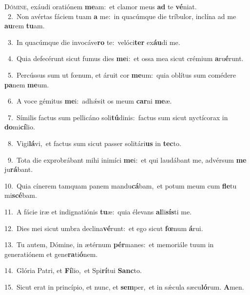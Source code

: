 \lettrine{\initial\textcolor{\initialcolor}{D}}{ómine,} exáudi oratiónem \textbf{me}\-am:~\star et clamor meus \textbf{ad} te \textbf{vé}\-niat.\\
{\numbfont\textcolor{\numbcolor}{~2.}}~Non avértas fáciem tuam \textbf{a} me:~\star in quacúmque die tríbulor, inclína ad me \textbf{au}\-rem \textbf{tu}\-am.\par
{\numbfont\textcolor{\numbcolor}{~3.}}~In quacúmque die invocáve\textbf{ro} te:~\star velóci\textbf{ter} ex\-\textbf{áu}\-di me.\par
{\numbfont\textcolor{\numbcolor}{~4.}}~Quia defecérunt sicut fumus dies \textbf{me}\-i:~\star et ossa mea sicut crémium \textbf{a}\-ru\-\textbf{é}\-runt.\par
{\numbfont\textcolor{\numbcolor}{~5.}}~Percússus sum ut fœnum, et áruit cor \textbf{me}\-um:~\star quia oblítus sum comédere \textbf{pa}\-nem \textbf{me}\-um.\par
{\numbfont\textcolor{\numbcolor}{~6.}}~A voce gémitus \textbf{me}\-i:~\star adhǽsit os meum \textbf{car}\-ni \textbf{me}\-æ.\par
{\numbfont\textcolor{\numbcolor}{~7.}}~Símilis factus sum pellicáno soli\-\textbf{tú}\-dinis:~\star factus sum sicut nyctícorax in \textbf{do}\-mi\-\textbf{cí}\-lio.\par
{\numbfont\textcolor{\numbcolor}{~8.}}~Vigi\-\textbf{lá}\-vi,~\star et factus sum sicut passer solitári\textbf{us} in \textbf{tec}\-to.\par
{\numbfont\textcolor{\numbcolor}{~9.}}~Tota die exprobrábant mihi inimíci \textbf{me}\-i:~\star et qui laudábant me, advérsum \textbf{me} ju\-\textbf{rá}\-bant.\par
{\numbfont\textcolor{\numbcolor}{10.}}~Quia cínerem tamquam panem mandu\-\textbf{cá}\-bam,~\star et potum meum cum \textbf{fle}\-tu mi\-\textbf{scé}\-bam.\par
{\numbfont\textcolor{\numbcolor}{11.}}~A fácie iræ et indignatiónis \textbf{tu}\-æ:~\star quia élevans \textbf{al}\-li\-\textbf{sís}\-ti me.\par
{\numbfont\textcolor{\numbcolor}{12.}}~Dies mei sicut umbra declina\-\textbf{vé}\-runt:~\star et ego sicut \textbf{fœ}\-num \textbf{á}\-rui.\par
{\numbfont\textcolor{\numbcolor}{13.}}~Tu autem, Dómine, in ætérnum \textbf{pér}\-manes:~\star et memoriále tuum in generatiónem et gene\-\textbf{ra}\-ti\-\textbf{ó}\-nem.\par
{\numbfont\textcolor{\numbcolor}{14.}}~Glória Patri, et \textbf{Fí}\-lio,~\star et Spi\-\textbf{rí}\-tui \textbf{Sanc}\-to.\par
{\numbfont\textcolor{\numbcolor}{15.}}~Sicut erat in princípio, et nunc, et \textbf{sem}\-per,~\star et in sǽcula sæcu\-\textbf{ló}\-rum. \textbf{A}\-men.\par
